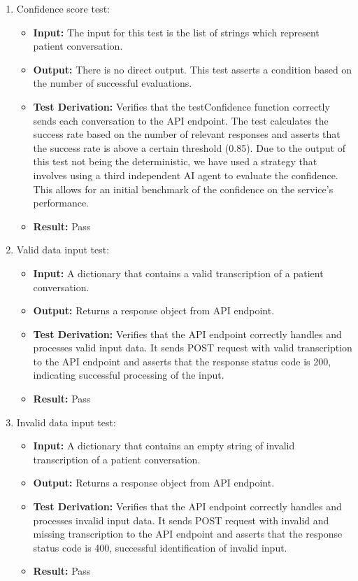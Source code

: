 \documentclass[12pt, titlepage]{article}
\begin{document}
  \begin{enumerate}
    \item Confidence score test:
      \begin{itemize}
        \item \textbf{Input:} The input for this test is the list of strings which represent patient conversation.   
        \item \textbf{Output:} There is no direct output. This test asserts a condition based on the number of successful evaluations.
        \item \textbf{Test Derivation:} Verifies that the testConfidence function correctly sends each conversation to the API endpoint. The test calculates the success rate based on the number of relevant responses and asserts that the success rate is above a certain threshold (0.85). Due to the output of this test not being the deterministic, we have used a strategy that involves using a third independent AI agent to evaluate the confidence. This allows for an initial benchmark of the confidence on the service's performance. 
        \item \textbf{Result:} Pass
      \end{itemize}

    \item Valid data input test:
      \begin{itemize}
        \item \textbf{Input:} A dictionary that contains a valid transcription of a patient conversation. 
        \item \textbf{Output:} Returns a response object from API endpoint.
        \item \textbf{Test Derivation:} Verifies that the API endpoint correctly handles and processes valid input data. It sends POST request with valid transcription to the API endpoint and asserts that the response status code is 200, indicating successful processing of the input.
        \item \textbf{Result:} Pass
      \end{itemize}

    \item Invalid data input test:
      \begin{itemize}
        \item \textbf{Input:} A dictionary that contains an empty string of invalid transcription of a patient conversation.    
        \item \textbf{Output:} Returns a response object from API endpoint.
        \item \textbf{Test Derivation:} Verifies that the API endpoint correctly handles and processes invalid input data. It sends POST request with invalid and missing transcription to the API endpoint and asserts that the response status code is 400, successful identification of invalid input.
        \item \textbf{Result:} Pass
      \end{itemize}
  \end{enumerate}
\end{document}
